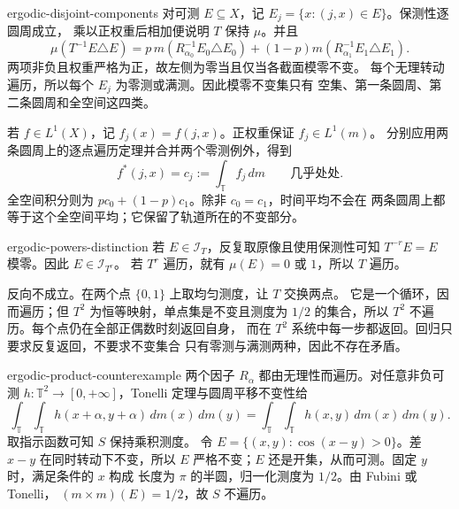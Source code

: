\begin{solution}{ergodic-disjoint-components}
对可测 $E\subseteq X$，记 $E_j=\{x:(j,x)\in E\}$。保测性逐圆周成立，
乘以正权重后相加便说明 $T$ 保持 $\mu$。并且
\[
 \mu(T^{-1}E\triangle E)
 =p\,m(R_{\alpha_0}^{-1}E_0\triangle E_0)
  +(1-p)m(R_{\alpha_1}^{-1}E_1\triangle E_1).
\]
两项非负且权重严格为正，故左侧为零当且仅当各截面模零不变。
每个无理转动遍历，所以每个 $E_j$ 为零测或满测。因此模零不变集只有
空集、第一条圆周、第二条圆周和全空间这四类。

若 $f\in L^1(X)$，记 $f_j(x)=f(j,x)$。正权重保证 $f_j\in L^1(m)$。
分别应用两条圆周上的逐点遍历定理并合并两个零测例外，得到
\[
 f^*(j,x)=c_j:=\int_{\mathbb T}f_j\,dm
 \qquad\text{几乎处处}.
\]
全空间积分则为 $pc_0+(1-p)c_1$。除非 $c_0=c_1$，时间平均不会在
两条圆周上都等于这个全空间平均；它保留了轨道所在的不变部分。
\end{solution}

\begin{solution}{ergodic-powers-distinction}
若 $E\in\mathcal I_T$，反复取原像且使用保测性可知
$T^{-r}E=E$ 模零。因此 $E\in\mathcal I_{T^r}$。
若 $T^r$ 遍历，就有 $\mu(E)=0$ 或 $1$，所以 $T$ 遍历。

反向不成立。在两个点 $\{0,1\}$ 上取均匀测度，让 $T$ 交换两点。
它是一个循环，因而遍历；但 $T^2$ 为恒等映射，单点集是不变且测度为
$1/2$ 的集合，所以 $T^2$ 不遍历。每个点仍在全部正偶数时刻返回自身，
而在 $T^2$ 系统中每一步都返回。回归只要求反复返回，不要求不变集合
只有零测与满测两种，因此不存在矛盾。
\end{solution}

\begin{solution}{ergodic-product-counterexample}
两个因子 $R_\alpha$ 都由无理性而遍历。对任意非负可测
$h:\mathbb T^2\to[0,+\infty]$，Tonelli 定理与圆周平移不变性给
\[
 \int_{\mathbb T}\int_{\mathbb T}
 h(x+\alpha,y+\alpha)\,dm(x)\,dm(y)
 =\int_{\mathbb T}\int_{\mathbb T}h(x,y)\,dm(x)\,dm(y).
\]
取指示函数可知 $S$ 保持乘积测度。
令
$E=\{(x,y):\cos(x-y)>0\}$。差 $x-y$ 在同时转动下不变，所以 $E$
严格不变；$E$ 还是开集，从而可测。固定 $y$ 时，满足条件的 $x$ 构成
长度为 $\pi$ 的半圆，归一化测度为 $1/2$。由 Fubini 或 Tonelli，
$(m\times m)(E)=1/2$，故 $S$ 不遍历。
\end{solution}

